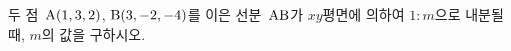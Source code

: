 두 점~$\mathrm{A}(1{,}\mkern3mu\mathopen{}3{,}\mkern3mu\mathopen{}2)$, $\mathrm{B}(3{,}\mkern3mu\mathopen{}-2{,}\mkern3mu\mathopen{}-4)$를 이은 선분~$\mathrm{AB}$가 $xy$평면에 의하여 $1:m$으로 내분될 때, $m$의 값을 구하시오.

